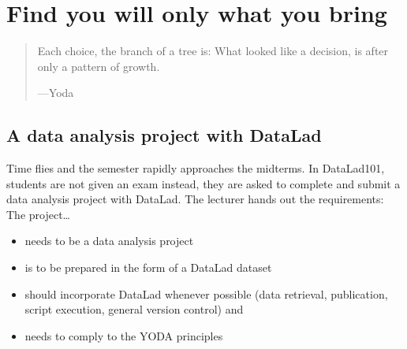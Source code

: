 \chapter{Find you will only what you bring}
\label{\detokenize{basics/basics-yoda:you-will-find-only-what-you-bring-in}}\label{\detokenize{basics/basics-yoda:chapter-yoda}}\label{\detokenize{basics/basics-yoda::doc}}
\begin{quote}

\sphinxAtStartPar
Each choice, the branch of a tree is: What looked like a decision, is after only a pattern of growth.

\begin{flushright}
---Yoda
\end{flushright}
\end{quote}

\sphinxstepscope


\section{A data analysis project with DataLad}
\label{\detokenize{basics/101-126-intro:a-data-analysis-project-with-datalad}}\label{\detokenize{basics/101-126-intro:intromidterm}}\label{\detokenize{basics/101-126-intro::doc}}
\sphinxAtStartPar
Time flies and the semester rapidly approaches the midterms.
In DataLad\sphinxhyphen{}101, students are not given an exam \textendash{} instead, they are
asked to complete and submit a data analysis project with DataLad.
The lecturer hands out the requirements: The project…
\begin{itemize}
\item {} 
\sphinxAtStartPar
needs to be a data analysis project

\item {} 
\sphinxAtStartPar
is to be prepared in the form of a DataLad dataset

\item {} 
\sphinxAtStartPar
should incorporate DataLad whenever possible (data retrieval, publication,
script execution, general version control) and

\item {} 
\sphinxAtStartPar
needs to comply to the YODA principles

\end{itemize}


